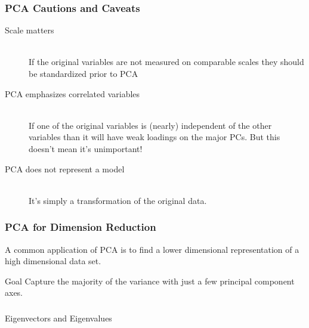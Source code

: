\documentclass{beamer}
\begin{document}



\begin{frame}
  \frametitle{PCA Cautions and Caveats}

\begin{description}

\item[Scale matters] \mbox{}\\
If the original variables are not measured on comparable scales they should be standardized prior to PCA

\item[PCA emphasizes correlated variables] \mbox{}\\
If one of the original variables is (nearly) independent of the other variables than it will have weak loadings on the major PCs. But this doesn't mean it's unimportant!

\item[PCA does not represent a model] \mbox{}\\
It's simply a transformation of the original data.

\end{description}

\end{frame}

\begin{frame}
  \frametitle{PCA for Dimension Reduction}


A common application of PCA is to find a lower dimensional representation of a high dimensional data set.
\bigskip 

\begin{block}{Goal}
Capture the majority of the variance with just a few principal component axes.
\end{block}

\end{frame}






\begin{frame}
  \frametitle{}

\begin{center}
\begin{Huge}
Eigenvectors and Eigenvalues
\end{Huge}
\end{center}
\end{frame}
\end{document}
